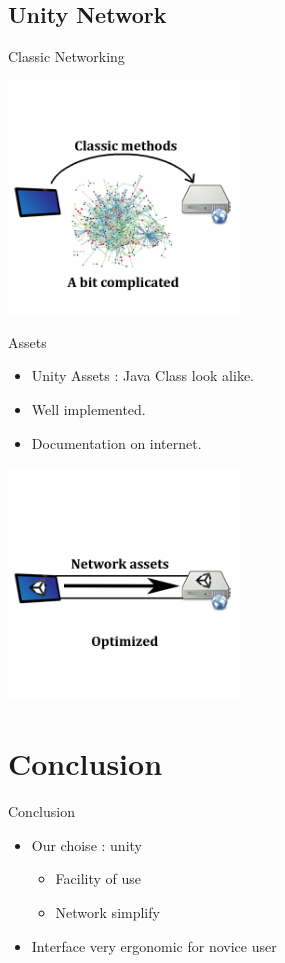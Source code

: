 \documentclass[a4paper,10pt]{beamer}
\begin{document}
		\subsection{Unity Network}
			
			\begin{frame}{Classic Networking}
					\centerline{\includegraphics[height=175pt]{images/network/classicnet.png}}
			\end{frame}
			
			\begin{frame}{Assets}
				\begin{itemize}
					\item Unity Assets : Java Class look alike.
					\item Well implemented.
					\item Documentation on internet.
				\end{itemize}	
				
				\centerline{\includegraphics[height=175pt]{images/network/optimized.png}}
				
				
			\end{frame}
			
		

	
	\section{Conclusion}
	
		\begin{frame}{Conclusion}
			\begin{itemize}
				\item Our choise : unity
					\begin{itemize}
						\item Facility of use
						\item Network simplify
					\end{itemize}
				\item Interface very ergonomic for novice user
			\end{itemize}
		\end{frame}
		
\end{document}
